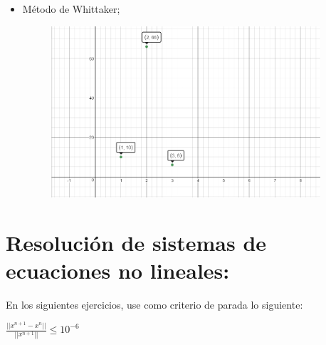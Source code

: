 \documentclass{udparticle}
\begin{document}
\begin{enumerate}
\begin{enumerate}
\begin{itemize}
				 
				 \item Método de Whittaker;
				 \begin{figure}[H]
					\centering	\includegraphics[width=10cm]{WhittakerEj6} 
				\end{figure}	
			\end{itemize}
        \end{enumerate}
\end{enumerate}
\newpage
\section{Resolución de sistemas de ecuaciones no lineales:}
    
        
        En los siguientes ejercicios, use como criterio de parada lo siguiente:
        \begin{center}
            $ \frac{|| x^{n+1} - x^{n} ||}{|| x^{n+1} ||} \leq 10^{-6} $  
        \end{center}
\end{document}

